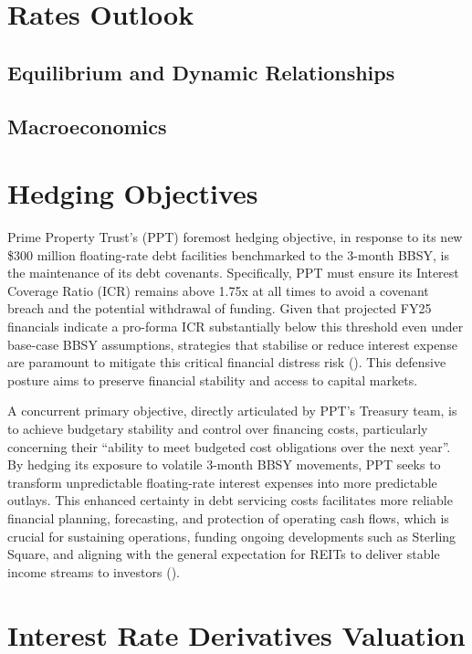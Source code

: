 \documentclass[11pt, a4paper, british]{article}
\begin{document}
\newpage
\section{Rates Outlook}

\subsection{Equilibrium and Dynamic Relationships}

\subsection{Macroeconomics}

\newpage

\section{Hedging Objectives}

Prime Property Trust’s (PPT) foremost hedging objective, in response to its new \$300 million floating-rate debt facilities benchmarked to the 3-month BBSY, is the maintenance of its debt covenants. Specifically, PPT must ensure its Interest Coverage Ratio (ICR) remains above 1.75x at all times to avoid a covenant breach and the potential withdrawal of funding. Given that projected FY25 financials indicate a pro-forma ICR substantially below this threshold even under base-case BBSY assumptions, strategies that stabilise or reduce interest expense are paramount to mitigate this critical financial distress risk (\cite{ss}). This defensive posture aims to preserve financial stability and access to capital markets.

A concurrent primary objective, directly articulated by PPT’s Treasury team, is to achieve budgetary stability and control over financing costs, particularly concerning their “ability to meet budgeted cost obligations over the next year”. By hedging its exposure to volatile 3-month BBSY movements, PPT seeks to transform unpredictable floating-rate interest expenses into more predictable outlays. This enhanced certainty in debt servicing costs facilitates more reliable financial planning, forecasting, and protection of operating cash flows, which is crucial for sustaining operations, funding ongoing developments such as Sterling Square, and aligning with the general expectation for REITs to deliver stable income streams to investors (\cite{fss}).
\newpage

\section{Interest Rate Derivatives Valuation}
\end{document}
